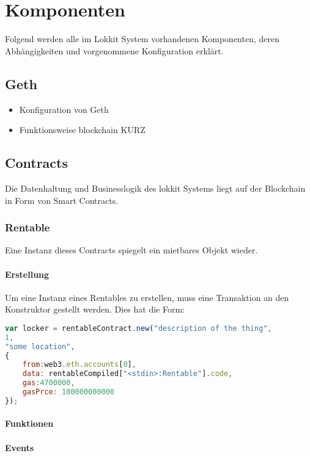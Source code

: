 \section{Komponenten}
\label{sec:Komponenten}
Folgend werden alle im Lokkit System vorhandenen Komponenten, deren Abhängigkeiten und vorgenommene Konfiguration erklärt.

\subsection{Geth}
\begin{itemize}
    \item Konfiguration von Geth
    \item Funktionsweise blockchain KURZ
\end{itemize}

\subsection{Contracts}
Die Datenhaltung und Businesslogik des lokkit Systems liegt auf der Blockchain in Form von Smart Contracts.
\subsubsection{Rentable}
Eine Instanz dieses Contracts spiegelt ein mietbares Objekt wieder.
\paragraph{Erstellung}
Um eine Instanz eines Rentables zu erstellen, muss eine Transaktion an den Konstruktor gestellt werden. Dies hat die Form:
\begin{lstlisting}[language=javascript,caption={Beispiel für Rentable Erstellung},label={lst:Rentable_Erstellung}]
var locker = rentableContract.new("description of the thing",
1,
"some location",
{
    from:web3.eth.accounts[0],
    data: rentableCompiled["<stdin>:Rentable"].code,
    gas:4700000,
    gasPrce: 100000000000
});
\end{lstlisting}

\paragraph{Funktionen}
\paragraph{Events}

\label{sys_subsubsec:Rentable}
